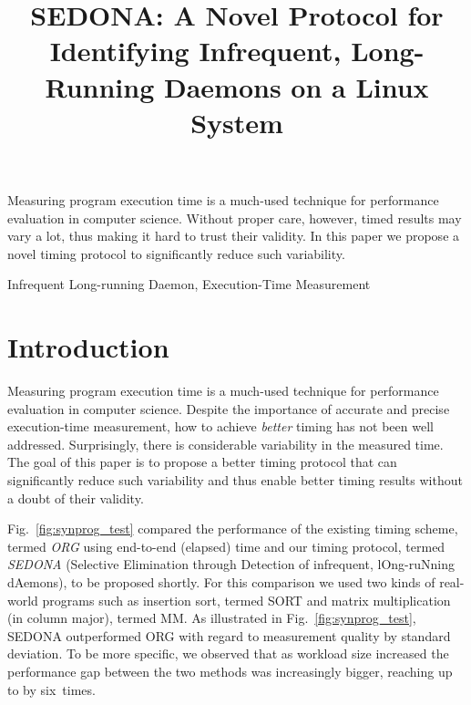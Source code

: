 \documentclass[letter]{ieice}
\title{SEDONA: A Novel Protocol for Identifying Infrequent, Long-Running Daemons on a Linux System}
\begin{document}
\maketitle

\begin{summary}
Measuring program execution time is 
a \hbox{much-used} technique for performance evaluation in computer science. 
Without proper care, however, timed results may vary a lot, 
thus making it hard to trust their validity. 
In this paper we propose a novel timing protocol to significantly 
reduce such variability.

\end{summary}
\begin{keywords}
Infrequent Long-running Daemon, Execution-Time Measurement
\end{keywords}

\section{Introduction}
\label{sec:intro}

Measuring program execution time is a much-used
technique for performance evaluation in computer science. 
Despite the importance of accurate and precise execution-time measurement, 
how to achieve {\em better} timing has not been well addressed. 
Surprisingly, there is considerable variability in the measured time.
The goal of this paper is to propose
a better timing protocol that can significantly reduce such variability 
and thus enable better timing results without a doubt of their validity.

{\color{blue}
Fig.~\ref{fig:synprog_test} compared the performance of 
the existing timing scheme, termed {\em ORG} using \hbox{end-to-end} (elapsed) time 
and our timing protocol, termed {\em \hbox{SEDONA}} 
(\hbox{Selective} Elimination through Detection of infrequent, \hbox{lOng-ruNning} dAemons), 
to be proposed shortly. 
For this comparison we used 
two kinds of real-world programs such as insertion sort, termed SORT and 
matrix multiplication (in column major), termed MM. 
As illustrated in Fig.~\ref{fig:synprog_test}, 
SEDONA outperformed ORG with regard to measurement quality by standard deviation. 
To be more specific, we observed that as workload size increased the performance gap between the two methods 
was increasingly bigger, reaching up to by six~times. 
}
\end{document}
